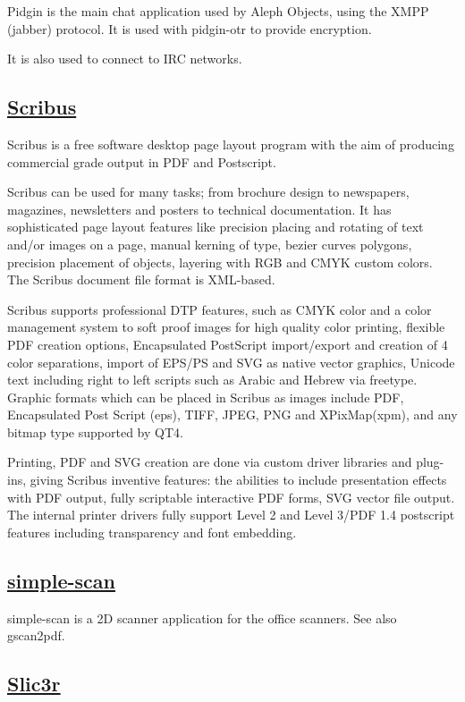 Pidgin is the main chat application used by Aleph Objects, using the XMPP
(jabber) protocol. It is used with pidgin-otr to provide encryption.

It is also used to connect to IRC networks.
 
\subsection{\href{http://www.scribus.net}{Scribus}}

 Scribus is a free software desktop page layout program with the aim of
 producing commercial grade output in PDF and Postscript.
 
 Scribus can be used for many tasks; from brochure design to newspapers,
 magazines, newsletters and posters to technical documentation. It has
 sophisticated page layout features like precision placing and rotating of text
 and/or images on a page, manual kerning of type, bezier curves polygons,
 precision placement of objects, layering with RGB and CMYK custom colors. The
 Scribus document file format is XML-based.
 
 Scribus supports professional DTP features, such as CMYK color and a
 color management system to soft proof images for high quality color printing,
 flexible PDF creation options, Encapsulated PostScript import/export and
 creation of 4 color separations, import of EPS/PS and SVG as native vector
 graphics, Unicode text including right to left scripts such as Arabic and
 Hebrew via freetype. Graphic formats which can be placed in Scribus as images
 include PDF, Encapsulated Post Script (eps), TIFF, JPEG, PNG and XPixMap(xpm),
 and any bitmap type supported by QT4.
 
 Printing, PDF and SVG creation are done via custom driver libraries and
 plug-ins, giving Scribus inventive features: the abilities to include
 presentation effects with PDF output, fully scriptable interactive PDF
 forms, SVG vector file output. The internal printer drivers fully support
 Level 2 and Level 3/PDF 1.4 postscript features including transparency and
 font embedding.
 
\subsection{\href{https://launchpad.net/simple-scan}{simple-scan}}

simple-scan is a 2D scanner application for the office scanners. See also
gscan2pdf.

\subsection{\href{http://slic3r.org/}{Slic3r}}


